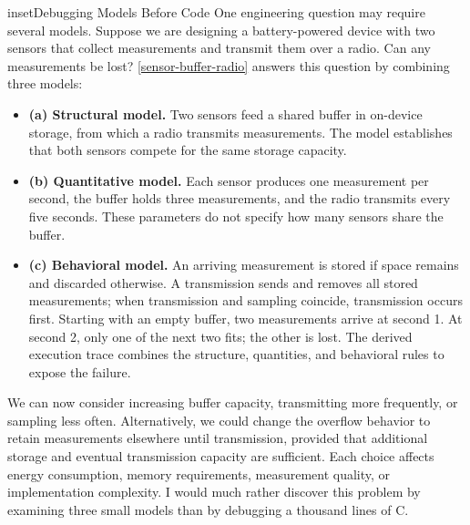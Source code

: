 \begin{bookbox}{inset}{Debugging Models Before Code}
\label{inset-debugging-models-before-code}
One engineering question may require several models. Suppose we are designing a battery-powered device with two sensors that collect measurements and transmit them over a radio. Can any measurements be lost? \autoref{sensor-buffer-radio} answers this question by combining three models:

\begin{itemize}
\tightlist
\item \textbf{(a) Structural model.} Two sensors feed a shared buffer in on-device storage, from which a radio transmits measurements. The model establishes that both sensors compete for the same storage capacity.
\item \textbf{(b) Quantitative model.} Each sensor produces one measurement per second, the buffer holds three measurements, and the radio transmits every five seconds. These parameters do not specify how many sensors share the buffer.
\item \textbf{(c) Behavioral model.} An arriving measurement is stored if space remains and discarded otherwise. A transmission sends and removes all stored measurements; when transmission and sampling coincide, transmission occurs first. Starting with an empty buffer, two measurements arrive at second 1. At second 2, only one of the next two fits; the other is lost. The derived execution trace combines the structure, quantities, and behavioral rules to expose the failure.
\end{itemize}

We can now consider increasing buffer capacity, transmitting more frequently, or sampling less often. Alternatively, we could change the overflow behavior to retain measurements elsewhere until transmission, provided that additional storage and eventual transmission capacity are sufficient. Each choice affects energy consumption, memory requirements, measurement quality, or implementation complexity. I would much rather discover this problem by examining three small models than by debugging a thousand lines of C.


\end{bookbox}
